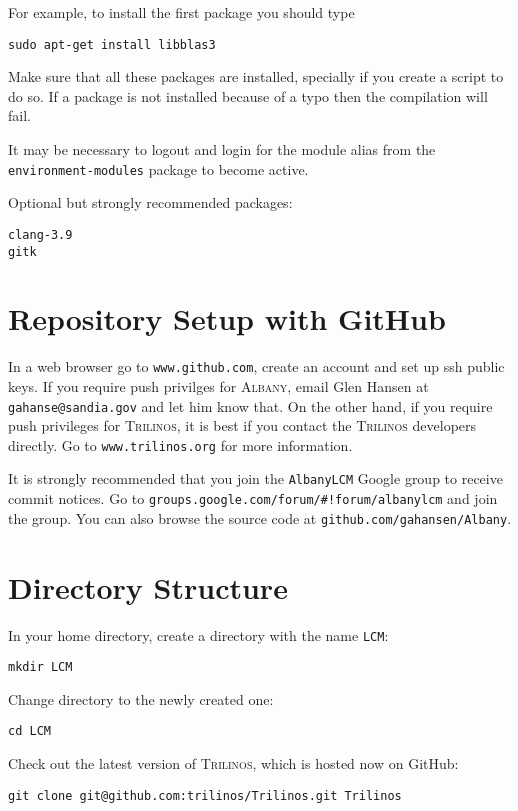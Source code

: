 \documentclass{article}
\newcommand{\trilinos}{\textsc{Trilinos}}
\newcommand{\albany}{\textsc{Albany}}
\begin{document}
For example, to install the first package you should type
\begin{verbatim}
sudo apt-get install libblas3
\end{verbatim}

Make sure that all these packages are installed, specially if you
create a script to do so. If a package is not installed because of a
typo then the compilation will fail.

It may be necessary to logout and login for the module alias from the
\verb+environment-modules+ package to become active.

Optional but strongly recommended packages:
\begin{verbatim}
clang-3.9
gitk
\end{verbatim}

\section{Repository Setup with GitHub}
\label{sec:repo}

In a web browser go to \verb+www.github.com+, create an account and
set up ssh public keys. If you require push privilges for \albany{},
email Glen Hansen at \verb+gahanse@sandia.gov+ and let him know
that. On the other hand, if you require push privileges for \trilinos{},
it is best if you contact the \trilinos{} developers directly. Go to
\verb+www.trilinos.org+ for more information.

It is strongly recommended that you join the \verb+AlbanyLCM+ Google
group to receive commit notices. Go to
\verb+groups.google.com/forum/#!forum/albanylcm+ and join the
group. You can also browse the source code at
\verb+github.com/gahansen/Albany+.

\section{Directory Structure}
In your home directory, create a directory with the name \verb+LCM+:
\begin{verbatim}
mkdir LCM
\end{verbatim}

Change directory to the newly created one:
\begin{verbatim}
cd LCM
\end{verbatim}

Check out the latest version of \trilinos{}, which is hosted now on
GitHub:
\begin{verbatim}
git clone git@github.com:trilinos/Trilinos.git Trilinos
\end{verbatim}
\end{document}
